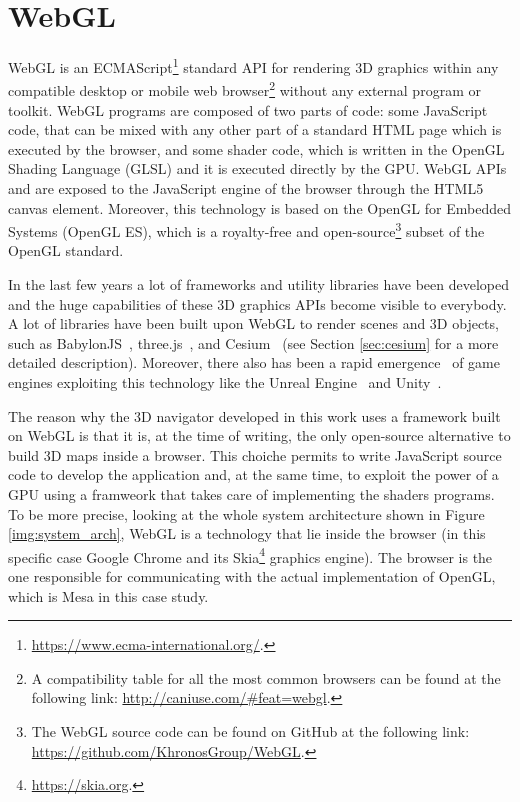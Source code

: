 \section{WebGL} \label{sec:webgl}
WebGL is an ECMAScript\footnote{\url{https://www.ecma-international.org/}.}
standard API for rendering 3D graphics within any compatible
desktop or mobile web browser\footnote{A compatibility table for all the most
common browsers can be found at the following link: \url{http://caniuse.com/#feat=webgl}.}
without any external program or toolkit. WebGL programs are composed of two parts
of code: some JavaScript code, that can be mixed with any other part of a standard
HTML page which is executed by the browser, and some shader code, which is written 
in the OpenGL Shading Language (GLSL) and it is executed directly by the GPU.
WebGL APIs and are exposed to the JavaScript engine of the browser through the
HTML5 canvas element. Moreover, this technology is based on the OpenGL for Embedded
Systems (OpenGL ES), which is a royalty-free and open-source\footnote{The WebGL source
code can be found on GitHub at the following link: \url{https://github.com/KhronosGroup/WebGL}.}
subset of the OpenGL standard.

In the last few years a lot of frameworks and utility libraries have been developed
and the huge capabilities of these 3D graphics APIs become visible to everybody.
A lot of libraries have been built upon WebGL to render scenes and 3D objects, such
as BabylonJS~\cite{babylon3d}, three.js~\cite{cabello2010three}, and 
Cesium~\cite{cozzi20113d} (see Section \ref{sec:cesium} for a more detailed description).
Moreover, there also has been a rapid emergence~\cite{parisi2014programming} of
game engines exploiting this technology like the Unreal Engine~\cite{games2007unreal}
and Unity~\cite{engine9unity}.

The reason why the 3D navigator developed in this work uses a framework built on
WebGL is that it is, at the time of writing, the only open-source alternative to
build 3D maps inside a browser. This choiche permits to write JavaScript source
code to develop the application and, at the same time, to exploit the power of
a GPU using a framweork that takes care of implementing the shaders programs.
To be more precise, looking at the whole system architecture shown in Figure
\ref{img:system_arch}, WebGL is a technology that lie inside the browser
(in this specific case Google Chrome and its Skia\footnote{\url{https://skia.org}.}
graphics engine). The browser is the one responsible for communicating with
the actual implementation of OpenGL, which is Mesa in this case study.


